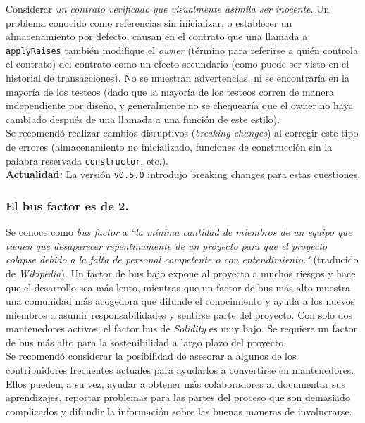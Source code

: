 Considerar \textit{un contrato verificado que visualmente asimila ser inocente}\cite{EtherscanRopstenContratoMalicioso}. Un problema conocido como referencias sin inicializar, o establecer un almacenamiento por defecto, causan en el contrato que una llamada a \verb|applyRaises| también modifique el \textit{owner} (término para referirse a quién controla el contrato) del contrato como un efecto secundario (como puede ser visto en el historial de transacciones). No se muestran advertencias, ni se encontraría en la mayoría de los testeos (dado que la mayoría de los testeos corren de manera independiente por diseño, y generalmente no se chequearía que el owner no haya cambiado después de una llamada a una función de este estilo).\\

Se recomendó realizar cambios disruptivos (\textit{breaking changes}) al corregir este tipo de errores (almacenamiento no inicializado, funciones de construcción sin la palabra reservada \verb|constructor|, etc.).\\

\textbf{Actualidad:} La versión \texttt{v0.5.0} introdujo breaking changes para estas cuestiones.

\subsubsection{El bus factor es de 2.}
Se conoce como \textit{bus factor} a \textit{``la mínima cantidad de miembros de un equipo que tienen que desaparecer repentinamente de un proyecto para que el proyecto colapse debido a la falta de personal competente o con entendimiento."} (traducido de \textit{Wikipedia}\cite{WikiBusFactor}). Un factor de bus bajo expone al proyecto a muchos riesgos y hace que el desarrollo sea más lento, mientras que un factor de bus más alto muestra una comunidad más acogedora que difunde el conocimiento y ayuda a los nuevos miembros a asumir responsabilidades y sentirse parte del proyecto. Con solo dos mantenedores activos\cite{GHContributors}, el factor bus de \textit{Solidity} es muy bajo. Se requiere un factor de bus más alto para la sostenibilidad a largo plazo del proyecto.\\

Se recomendó considerar la posibilidad de asesorar a algunos de los contribuidores frecuentes actuales para ayudarlos a convertirse en mantenedores. Ellos pueden, a su vez, ayudar a obtener más colaboradores al documentar sus aprendizajes, reportar problemas para las partes del proceso que son demasiado complicados y difundir la información sobre las buenas maneras de involucrarse.\\

